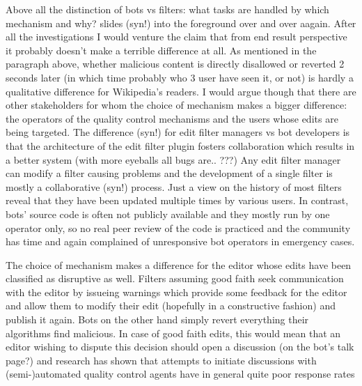Above all the distinction of bots vs filters: what tasks are handled by which mechanism and why? slides (syn!) into the foreground over and over aagain.
After all the investigations I would venture the claim that from end result perspective it probably doesn't make a terrible difference at all.
As mentioned in the paragraph above, whether malicious content is directly disallowed or reverted 2 seconds later (in which time probably who 3 user have seen it, or not) is hardly a qualitative difference for Wikipedia's readers.
I would argue though that there are other stakeholders for whom the choice of mechanism makes a bigger difference:
the operators of the quality control mechanisms and the users whose edits are being targeted.
The difference (syn!) for edit filter managers vs bot developers is that the architecture of the edit filter plugin fosters collaboration which results in a better system (with more eyeballs all bugs are.. ???)
Any edit filter manager can modify a filter causing problems and the development of a single filter is mostly a collaborative (syn!) process.
Just a view on the history of most filters reveal that they have been updated multiple times by various users.
In contrast, bots' source code is often not publicly available and they mostly run by one operator only, so no real peer review of the code is practiced and the community has time and again complained of unresponsive bot operators in emergency cases.

The choice of mechanism makes a difference for the editor whose edits have been classified as disruptive as well.
Filters assuming good faith seek communication with the editor by issueing warnings which provide some feedback for the editor and allow them to modify their edit (hopefully in a constructive fashion) and publish it again.
Bots on the other hand simply revert everything their algorithms find malicious.
In case of good faith edits, this would mean that an editor wishing to dispute this decision should open a discussion (on the bot's talk page?) and research has shown that attempts to initiate discussions with (semi-)automated quality control agents have in general quite poor response rates %


